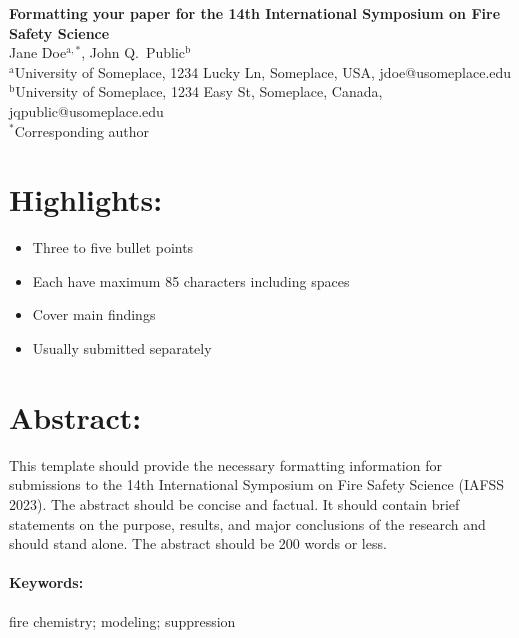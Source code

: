 \documentclass[fleqn,letterpaper,12pt]{article}
\begin{document}
\linenumbers

% 

\begin{flushleft}
\textbf{Formatting your paper for the 14th International Symposium on Fire Safety Science}\\
\vspace{8pt}
Jane Doe$^{\mathrm{a},*}$, John Q.~Public$^\mathrm{b}$\\
\vspace{8pt}
$^\mathrm{a}$University of Someplace, 1234 Lucky Ln, Someplace, USA, jdoe@usomeplace.edu \\
\vspace{8pt}
$^\mathrm{b}$University of Someplace, 1234 Easy St, Someplace, Canada, jqpublic@usomeplace.edu \\
\vspace{8pt}
$^*$Corresponding author
\end{flushleft}
\rm

\section*{Highlights:}

\begin{itemize}
\item Three to five bullet points
\item Each have maximum 85 characters including spaces
\item Cover main findings
\item Usually submitted separately
\end{itemize}

\section*{Abstract:}

This template should provide the necessary formatting information for submissions to the 14th International Symposium on Fire Safety Science (IAFSS 2023).  The abstract should be concise and factual.  It should contain brief statements on the purpose, results, and major conclusions of the research and should stand alone.  The abstract should be 200 words or less.

\paragraph*{Keywords:} fire chemistry; modeling; suppression
\end{document}
